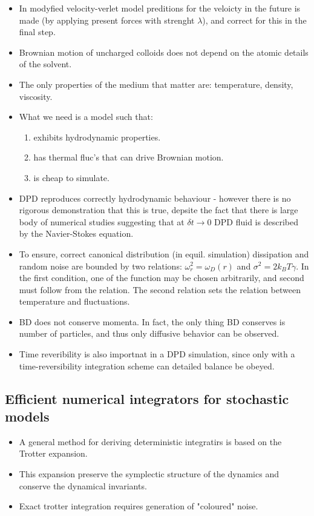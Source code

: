\documentclass[10pt,a4paper]{article}
\begin{document}
\begin{itemize}
 \item In modyfied velocity-verlet model preditions for the veloicty in the future is made (by applying present forces with strenght $\lambda$),
 and correct for this in the final step.
 
 \item Brownian motion of uncharged colloids does not depend on the atomic details of the solvent.
 \item The only properties of the medium that matter are: temperature, density, viscosity.
 \item What we need is a model such that:
 \begin{enumerate}
  \item exhibits hydrodynamic properties.
  \item has thermal fluc's that can drive Brownian motion.
  \item is cheap to simulate.
 \end{enumerate}
 \item DPD reproduces correctly hydrodynamic behaviour - however there is no rigorous demonstration that this is true, 
 depsite the fact that there is large body of numerical studies suggesting that at $\delta t \rightarrow 0$ DPD fluid is described by the Navier-Stokes equation.
 \item To ensure, correct canonical distribution (in equil. simulation) dissipation and random noise are bounded by two relations: 
 $\omega^{2}_{r} = \omega_{D}(r)$ and $\sigma^2 = 2k_BT\gamma$. In the first condition, one of the function may be chosen arbitrarily, and second must follow from the relation.
 The second relation sets the relation between temperature and fluctuations.
 \item BD does not conserve momenta. In fact, the only thing BD conserves is number of particles, and thus only diffusive behavior can be observed.
 \item Time reveribility is also importnat in a DPD simulation, since only with a time-reversibility integration scheme can detailed balance be obeyed.
\end{itemize}

\subsection{Efficient numerical integrators for stochastic models \cite{cov:06a,cov:06b}}
\begin{itemize}
 \item A general method for deriving deterministic integratirs is based on the Trotter expansion.
 \item This expansion preserve the symplectic structure of the dynamics and conserve the dynamical invariants.
 \item Exact trotter integration requires generation of "coloured" noise.
\end{itemize}
\end{document}
